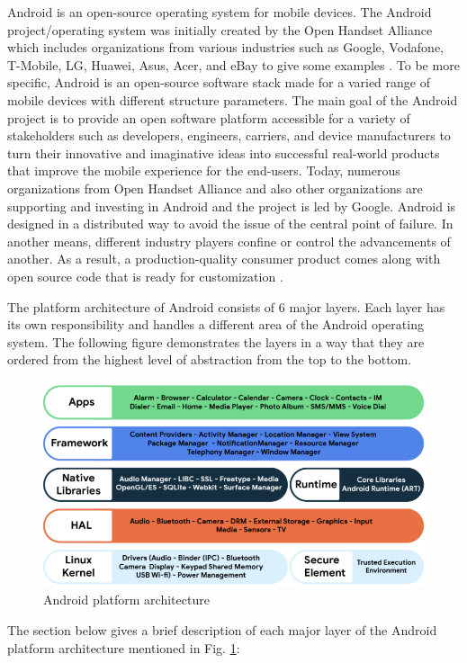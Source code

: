 Android is an open-source operating system for mobile devices. The Android project/operating system was initially created by the Open Handset Alliance which includes organizations from various industries such as Google, Vodafone, T-Mobile, LG, Huawei, Asus, Acer, and eBay to give some examples \cite{6}. To be more specific, Android is an open-source software stack made for a varied range of mobile devices with different structure parameters. The main goal of the Android project is to provide an open software platform accessible for a variety of stakeholders such as developers, engineers, carriers, and device manufacturers to turn their innovative and imaginative ideas into successful real-world products that improve the mobile experience for the end-users. Today, numerous organizations from Open Handset Alliance and also other organizations are supporting and investing in Android and the project is led by Google. Android is designed in a distributed way to avoid the issue of the central point of failure. In another means, different industry players confine or control the advancements of another. As a result, a production-quality consumer product comes along with open source code that is ready for customization \cite{5}.

The platform architecture of Android consists of 6 major layers. Each layer has its own responsibility and handles a different area of the Android operating system. The following figure demonstrates the layers in a way that they are ordered from the highest level of abstraction from the top to the bottom.
\begin{figure}
    \centering
    \includegraphics[scale=0.5]{figures/android_os.png}
    \caption{Android platform architecture \protect\cite{5}}
    \label{fig:android_platform_architecture}
\end{figure}

The section below gives a brief description of each major layer of the Android platform architecture mentioned in Fig. \ref{fig:android_platform_architecture}: 